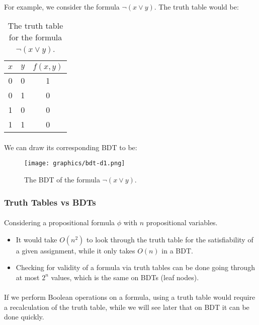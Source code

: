\documentclass{article}
\theoremstyle{plain}
\theoremstyle{definition}
\begin{document}
\begin{multicols}{2}
\paragraph{} For example, we consider the formula $\lnot(x \lor y)$. The truth table would be:

\begin{table}[H]
\centering
\begin{tabular}{c | c | c}
$x$ & $y$ & $f(x, y)$ \\
\hline
0 & 0 & 1 \\
0 & 1 & 0 \\
1 & 0 & 0 \\
1 & 1 & 0 \\
\end{tabular}
\caption{The truth table for the formula $\lnot(x \lor y)$.}
\end{table}

\paragraph{} We can draw its corresponding BDT to be:

\begin{figure}[H]
\centering
\texttt{[image: graphics/bdt-d1.png]}
\caption{The BDT of the formula $\lnot(x \lor y)$.}\label{fig:BDTD1}
\end{figure}

\subsubsection{Truth Tables vs BDTs}\label{sec:TruthTablesvsBDTs}

\paragraph{} Considering a propositional formula $\phi$ with $n$ propositional variables. 

\begin{itemize}
\item It would take $O(n^2)$ to look through the truth table for the satisfiability of a given assignment, while it only takes $O(n)$ in a BDT.
\item Checking for validity of a formula via truth tables can be done going through at most $2^n$ values, which is the same on BDTs (leaf nodes).
\end{itemize}

\paragraph{} If we perform Boolean operations on a formula, using a truth table would require a recalculation of the truth table, while we will see later that on BDT it can be done quickly. 


\end{multicols}
\end{document}
